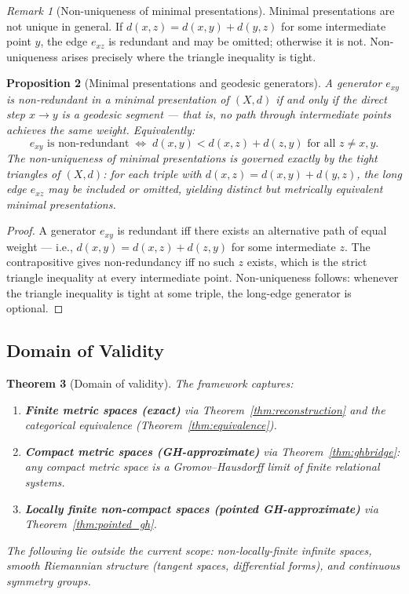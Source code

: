 \documentclass{article}
\newtheorem{theorem}{Theorem}[section]
\newtheorem{proposition}[theorem]{Proposition}
\theoremstyle{definition}
\theoremstyle{remark}
\newtheorem{remark}[theorem]{Remark}
\begin{document}
\begin{remark}[Non-uniqueness of minimal presentations]
Minimal presentations are not unique in general. If
$d(x,z) = d(x,y) + d(y,z)$ for some intermediate point $y$,
the edge $e_{xz}$ is redundant and may be omitted; otherwise it
is not. Non-uniqueness arises precisely where the triangle
inequality is tight.
\end{remark}

\begin{proposition}[Minimal presentations and geodesic generators]
\label{prop:geodesic}
A generator $e_{xy}$ is non-redundant in a minimal presentation
of $(X,d)$ if and only if the direct step $x \to y$ is a
geodesic segment --- that is, no path through intermediate
points achieves the same weight. Equivalently:
\[
  e_{xy} \text{ is non-redundant}
  \;\iff\;
  d(x,y) < d(x,z) + d(z,y)
  \text{ for all } z \neq x, y.
\]
The non-uniqueness of minimal presentations is governed exactly
by the tight triangles of $(X,d)$: for each triple with
$d(x,z) = d(x,y) + d(y,z)$, the long edge $e_{xz}$ may be
included or omitted, yielding distinct but metrically equivalent
minimal presentations.
\end{proposition}

\begin{proof}
A generator $e_{xy}$ is redundant iff there exists an alternative
path of equal weight --- i.e., $d(x,y) = d(x,z) + d(z,y)$ for
some intermediate $z$. The contrapositive gives non-redundancy
iff no such $z$ exists, which is the strict triangle inequality
at every intermediate point. Non-uniqueness follows: whenever
the triangle inequality is tight at some triple, the long-edge
generator is optional.
\end{proof}

\subsection{Domain of Validity}

\begin{theorem}[Domain of validity]
\label{thm:scope}
The framework captures:
\begin{enumerate}[label=(\roman*)]
  \item \textbf{Finite metric spaces (exact)} via
        Theorem~\ref{thm:reconstruction} and the categorical
        equivalence (Theorem~\ref{thm:equivalence}).
  \item \textbf{Compact metric spaces (GH-approximate)} via
        Theorem~\ref{thm:ghbridge}: any compact metric space is
        a Gromov--Hausdorff limit of finite relational systems.
  \item \textbf{Locally finite non-compact spaces
        (pointed GH-approximate)} via
        Theorem~\ref{thm:pointed_gh}.
\end{enumerate}
The following lie outside the current scope: non-locally-finite
infinite spaces, smooth Riemannian structure (tangent spaces,
differential forms), and continuous symmetry groups.
\end{theorem}
\end{document}
